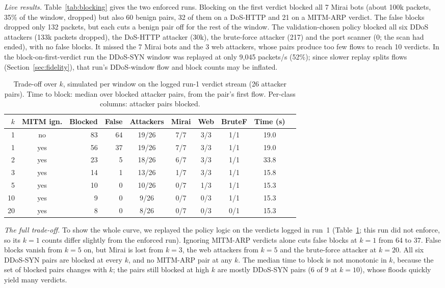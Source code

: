\emph{Live results.} Table~\ref{tab:blocking} gives the two enforced runs. Blocking on the first verdict blocked all 7 Mirai bots (about 100k packets, 35\% of the window, dropped) but also 60 benign pairs, 32 of them on a DoS-HTTP and 21 on a MITM-ARP verdict. The false blocks dropped only 132 packets, but each cuts a benign pair off for the rest of the window. The validation-chosen policy blocked all six DDoS attackers (133k packets dropped), the DoS-HTTP attacker (30k), the brute-force attacker (217) and the port scanner (0; the scan had ended), with no false blocks. It missed the 7 Mirai bots and the 3 web attackers, whose pairs produce too few flows to reach 10 verdicts. In the block-on-first-verdict run the DDoS-SYN window was replayed at only 9,045 packets/s (52\%); since slower replay splits flows (Section~\ref{sec:fidelity}), that run's DDoS-window flow and block counts may be inflated.

\begin{table}[t]
\centering
\caption{Trade-off over $k$, simulated per window on the logged run-1 verdict stream (26 attacker pairs). Time to block: median over blocked attacker pairs, from the pair's first flow. Per-class columns: attacker pairs blocked.}
\label{tab:kcurve}
\footnotesize
\setlength{\tabcolsep}{2.2pt}
\begin{tabular}{rcrrcccccr}
\hline
$k$ & MITM ign. & Blocked & False & Attackers & Mirai & Web & BruteF & Time (s) \\
\hline
1  & no  & 83 & 64 & 19/26 & 7/7 & 3/3 & 1/1 & 19.0 \\
1  & yes & 56 & 37 & 19/26 & 7/7 & 3/3 & 1/1 & 19.0 \\
2  & yes & 23 &  5 & 18/26 & 6/7 & 3/3 & 1/1 & 33.8 \\
3  & yes & 14 &  1 & 13/26 & 1/7 & 3/3 & 1/1 & 15.8 \\
5  & yes & 10 &  0 & 10/26 & 0/7 & 1/3 & 1/1 & 15.3 \\
10 & yes &  9 &  0 &  9/26 & 0/7 & 0/3 & 1/1 & 15.3 \\
20 & yes &  8 &  0 &  8/26 & 0/7 & 0/3 & 0/1 & 15.3 \\
\hline
\end{tabular}
\end{table}

\emph{The full trade-off.} To show the whole curve, we replayed the policy logic on the verdicts logged in run~1 (Table~\ref{tab:kcurve}; this run did not enforce, so its $k=1$ counts differ slightly from the enforced run). Ignoring MITM-ARP verdicts alone cuts false blocks at $k=1$ from 64 to 37. False blocks vanish from $k=5$ on, but Mirai is lost from $k=3$, the web attackers from $k=5$ and the brute-force attacker at $k=20$. All six DDoS-SYN pairs are blocked at every $k$, and no MITM-ARP pair at any $k$. The median time to block is not monotonic in $k$, because the set of blocked pairs changes with $k$; the pairs still blocked at high $k$ are mostly DDoS-SYN pairs (6 of 9 at $k=10$), whose floods quickly yield many verdicts.


